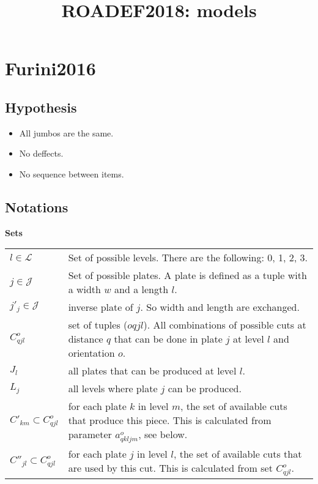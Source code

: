 \documentclass[a4paper,11pt]{article}
\title{ROADEF2018: models}
\author{}
\begin{document}
\maketitle

\section{Furini2016}

    \subsection{Hypothesis}

    \begin{itemize}
        \item All jumbos are the same.
        \item No deffects.
        \item No sequence between items.
    \end{itemize}

    \subsection{Notations}

    \textbf{Sets}

    \begin{tabular}{ll}
        $l \in \mathcal{L}$ & Set of possible levels. There are the following: 0, 1, 2, 3. \\
        $j \in \mathcal{J}$ & Set of possible plates. A plate is defined as a tuple with a width $w$ and a length $l$. \\
        $j'_j \in \mathcal{J}$ & inverse plate of $j$. So width and length are exchanged. \\
        $C^o_{qjl}$ & set of tuples ($oqjl$). All combinations of possible cuts at distance $q$ that can be done in plate $j$ at level $l$ and orientation $o$. \\
        $J_{l}$ & all plates that can be produced at level $l$.\\
        $L_{j}$ & all levels where plate $j$ can be produced.\\
        $C'_{km} \subset C^o_{qjl}$ & for each plate $k$ in level $m$, the set of available cuts that produce this piece. This is calculated from parameter $a^o_{qkljm}$, see below. \\
        $C''_{jl} \subset C^o_{qjl}$ & for each plate $j$ in level $l$, the set of available cuts that are used by this cut. This is calculated from set $C^o_{qjl}$. \\
    \end{tabular}
\end{document}

